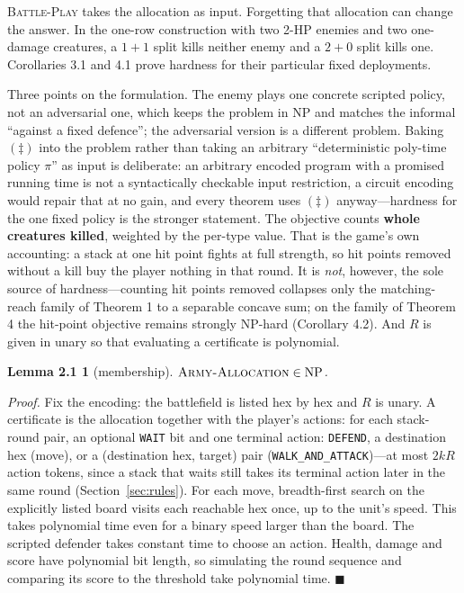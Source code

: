 \documentclass[11pt,a4paper]{article}
\theoremstyle{plain}
\newtheorem*{lemnp}{Lemma 2.1}
\theoremstyle{definition}
\theoremstyle{plain}
\theoremstyle{definition}
\theoremstyle{remark}
\newcommand{\ALLOC}{\textsc{Army-Allocation}}
\newcommand{\PLAY}{\textsc{Battle-Play}}
\newcommand{\qedbox}{\hfill$\blacksquare$}
\begin{document}
\PLAY{} takes the allocation as input. Forgetting that allocation can change the answer. In the one-row construction with two 2-HP enemies and two one-damage creatures, a $1+1$ split kills neither enemy and a $2+0$ split kills one. Corollaries 3.1 and 4.1 prove hardness for their particular fixed deployments.

Three points on the formulation. The enemy plays one concrete scripted policy, not an
adversarial one, which keeps the problem in NP and matches the informal ``against a fixed
defence''; the adversarial version is a different problem. Baking $(\ddagger)$ into the problem
rather than taking an arbitrary ``deterministic poly-time policy $\pi$'' as input is
deliberate: an arbitrary encoded program with a promised running time is not a syntactically
checkable input restriction, a circuit encoding would repair that at no gain, and every theorem
uses $(\ddagger)$ anyway---hardness for the one fixed policy is the stronger statement. The
objective counts \textbf{whole creatures killed}, weighted by the per-type value. That is the
game's own accounting: a stack at one hit point fights at full strength, so hit points removed
without a kill buy the player nothing in that round. It is \emph{not}, however, the sole source
of hardness---counting hit points removed collapses only the matching-reach family of Theorem 1
to a separable concave sum; on the family of Theorem 4 the hit-point objective remains strongly
NP-hard (Corollary 4.2). And $R$ is given in unary so that evaluating a certificate is
polynomial.

\begin{lemnp}[membership]
$\ALLOC\in\mathrm{NP}$.
\end{lemnp}

\noindent\emph{Proof.} Fix the encoding: the battlefield is listed hex by hex and $R$ is unary.
A certificate is the allocation together with the player's actions: for each stack-round pair,
an optional \texttt{WAIT} bit and one terminal action: \texttt{DEFEND}, a destination hex
(move), or a (destination hex, target) pair (\texttt{WALK\_AND\_ATTACK})---at most $2kR$
action tokens, since a stack that waits still takes its terminal action later in the same round
(Section~\ref{sec:rules}). For each move, breadth-first search on the explicitly listed board visits each reachable hex once, up to the unit's speed. This takes polynomial time even for a binary speed larger than the board. The scripted defender takes constant time to choose an action. Health, damage and score have polynomial bit length, so simulating the round sequence and comparing its score to the threshold take polynomial time. \qedbox
\end{document}
